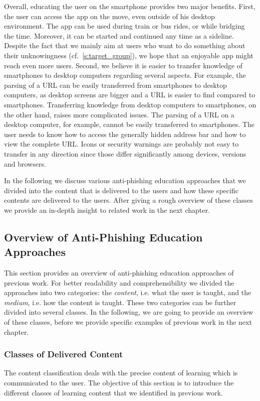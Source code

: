 Overall, educating the user on the smartphone provides two major benefits.
First, the user can access the app on the move, even outside of his desktop environment.
The app can be used during train or bus rides, or while bridging the time.
Moreover, it can be started and continued any time as a sideline.
Despite the fact that we mainly aim at users who want to do something about their unknowingness (cf.~\autoref{s:target_group}), we hope that an enjoyable app might reach even more users.
Second, we believe it is easier to transfer knowledge of smartphones to desktop computers regarding several aspects.
For example, the parsing of a URL can be easily transferred from smartphones to desktop computers, as desktop screens are bigger and a URL is easier to find compared to smartphones.
Transferring knowledge from desktop computers to smartphones, on the other hand, raises more complicated issues.
The parsing of a URL on a desktop computer, for example, cannot be easily transferred to smartphones.
The user needs to know how to access the generally hidden address bar and how to view the complete URL.
Icons or security warnings are probably not easy to transfer in any direction since those differ significantly among devices, versions and browsers.

In the following we discuss various anti-phishing education approaches that we divided into the content that is delivered to the users and how these specific contents are delivered to the users.
After giving a rough overview of these classes we provide an in-depth insight to related work in the next chapter.

\subsection{Overview of Anti-Phishing Education Approaches}
This section provides an overview of anti-phishing education approaches of previous work.
 For better readability and comprehensibility we divided the approaches into two categories: the \textit{content}, i.e.
 what the user is taught, and the 
\textit{medium}, i.e. how the content is taught.
These two categories can be further divided into several classes. 
In the following, we are going to provide an overview of these classes, before we provide specific examples of previous work in the next chapter.

\subsubsection{Classes of Delivered Content}
\label{s:content_classification}
The content classification deals with the precise content of learning which is communicated to the user. 
The objective of this section is to introduce the different classes of learning content that we identified in previous work.

